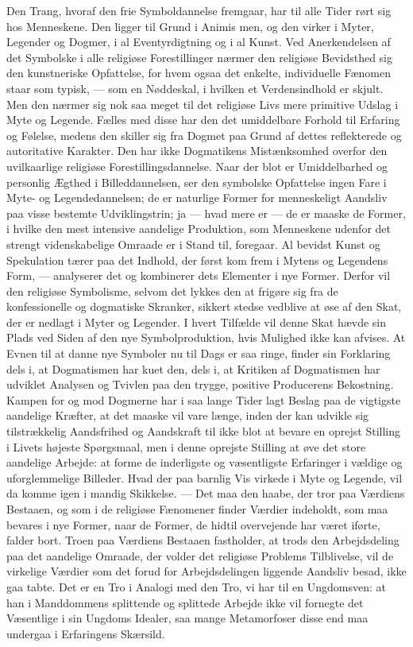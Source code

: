 \documentclass[12pt,a4paper,openany]{book}
\newcommand{\opage}[1]{\marginnote{\footnotesize\textit{[#1]}}}
\begin{document}
Den Trang, hvoraf den frie Symboldannelse fremgaar, har til alle Tider
rørt sig hos Menneskene. Den ligger til Grund i Animis%
\opage{140}men, og den virker i Myter, Legender og Dogmer, i al
Eventyrdigtning og i al Kunst. Ved Anerkendelsen af det Symbolske i alle
religiøse Forestillinger nærmer den religiøse Bevidsthed sig den
kunstneriske Opfattelse, for hvem ogsaa det enkelte, individuelle
Fænomen staar som typisk, --- som en Nøddeskal, i hvilken et
Verdensindhold er skjult. Men den nærmer sig nok saa meget til det
religiøse Livs mere primitive Udslag i Myte og Legende. Fælles med disse
har den det umiddelbare Forhold til Erfaring og Følelse, medens den
skiller sig fra Dogmet paa Grund af dettes reflekterede og autoritative
Karakter. Den har ikke Dogmatikens Mistænksomhed overfor den
uvilkaarlige religiøse Forestillingsdannelse. Naar der blot er
Umiddelbarhed og personlig Ægthed i Billeddannelsen, ser den symbolske
Opfattelse ingen Fare i Myte- og Legendedannelsen; de er naturlige
Former for menneskeligt Aandsliv paa visse bestemte Udviklingstrin; ja
--- hvad mere er --- de er maaske de Former, i hvilke den mest intensive
aandelige Produktion, som Menneskene udenfor det strengt videnskabelige
Omraade er i Stand til, foregaar. Al bevidst Kunst og Spekulation tærer
paa det Indhold, der først kom frem i Mytens og Legendens Form, ---
analyserer det og kombinerer dets Elementer i nye Former. Derfor vil den
religiøse Symbolisme, selvom det lykkes den at frigøre sig fra de
konfessionelle og dogmatiske Skranker, sikkert stedse vedblive at øse af
den Skat, der er nedlagt i Myter og Legender. I hvert Tilfælde vil denne
Skat hævde sin Plads ved Siden af den nye Symbolproduktion, hvis
Mulighed ikke kan afvises. At Evnen til at danne nye Symboler nu til
Dags er saa ringe, finder sin Forklaring dels i, at Dogmatismen har kuet
den, dels i, at Kritiken af Dogmatismen har udviklet Analysen og Tvivlen
paa den trygge, positive Producerens Bekostning. Kampen for og mod
Dogmerne har i saa lange Tider lagt Beslag paa de vigtigste aandelige
Kræfter, at det maaske vil vare længe, inden der kan udvikle sig
tilstrækkelig Aandsfrihed og Aandskraft til ikke blot at bevare en
oprejst Stilling i Livets højeste Spørgsmaal, men i denne oprejste
Stilling at øve det store aandelige Arbejde: at forme de inderligste og
væsentligste Erfaringer i vældige og uforglemmelige Billeder. Hvad der
paa barnlig Vis virkede i Myte og Legende, vil da komme igen i mandig
Skikkelse. --- Det maa den haabe, der tror paa Værdiens Bestaaen, og som
i de religiøse Fænomener finder Værdier indeholdt, som maa bevares i nye
Former, naar de Former, de hidtil overvejende har været iførte, falder
bort. Troen
\opage{141}paa Værdiens Bestaaen fastholder, at trods den Arbejdsdeling
paa det aandelige Omraade, der volder det religiøse Problems
Tilblivelse, vil de virkelige Værdier som det forud for Arbejdsdelingen
liggende Aandsliv besad, ikke gaa tabte. Det er en Tro i Analogi med den
Tro, vi har til en Ungdomsven: at han i Manddommens splittende og
splittede Arbejde ikke vil fornegte det Væsentlige i sin Ungdoms
Idealer, saa mange Metamorfoser disse end maa undergaa i Erfaringens
Skærsild.
\end{document}
